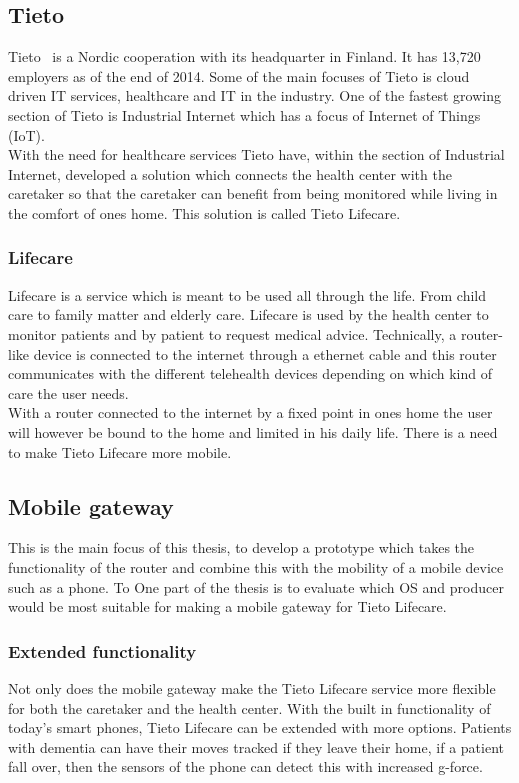 
\subsection{Tieto}
\label{sub:tieto}
	Tieto~\cite{tieto} is a Nordic cooperation with its headquarter in Finland. It has 13,720 employers as of the end of 2014. Some of the main focuses of Tieto is cloud driven IT services, healthcare and IT in the industry. One of the fastest growing section of Tieto is Industrial Internet which has a focus of Internet of Things (IoT).\\
	With the need for healthcare services Tieto have, within the section of Industrial Internet, developed a solution which connects the health center with the caretaker so that the caretaker can benefit from being monitored while living in the comfort of ones home. This solution is called Tieto Lifecare.

\subsubsection{Lifecare}
\label{subsub:lifecare}
	Lifecare is a service which is meant to be used all through the life. From child care to family matter and elderly care. Lifecare is used by the health center to monitor patients and by patient to request medical advice. Technically, a router-like device is connected to the internet through a ethernet cable and this router communicates with the different telehealth devices depending on which kind of care the user needs.\\
	With a router connected to the internet by a fixed point in ones home the user will however be bound to the home and limited in his daily life. There is a need to make Tieto Lifecare more mobile.

\subsection{Mobile gateway}
\label{sub:gateway}
	This is the main focus of this thesis, to develop a prototype which takes the functionality of the router and combine this with the mobility of a mobile device such as a phone. To 
	One part of the thesis is to evaluate which OS and producer would be most suitable for making a mobile gateway for Tieto Lifecare.\\
	

\subsubsection{Extended functionality}
\label{subsub:extendedFunc}
	Not only does the mobile gateway make the Tieto Lifecare service more flexible for both the caretaker and the health center. With the built in functionality of today's smart phones, Tieto Lifecare can be extended with more options. Patients with dementia can have their moves tracked if they leave their home, if a patient fall over, then the sensors of the phone can detect this with increased g-force.


